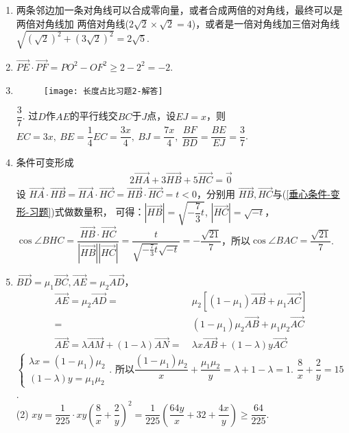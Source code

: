 \begin{enumerate}[label={\textbf{\arabic*.}},leftmargin=
    \inteval{\myenumleftmargin}pt]
\item 
两条邻边加一条对角线可以合成零向量，或者合成两倍的对角线，最终可以是两倍对角线加
两倍对角线($ 2\sqrt{2}\times \sqrt{2} =4 $)，或者是一倍对角线加三倍对角线\\
$ \sqrt{(\sqrt{2})^2+(3\sqrt{2})^2}=2\sqrt{5} $. 

\item $ \vec{PE}\cdot \vec{PF}=PO^2-OF^2 \geq 2-2^2=-2 $. 

\item 
\begin{figure}[h]
    \centering
    \texttt{[image: 长度占比习题2-解答]}
\end{figure}
$ \dfrac{3}{7} $. 过$ D $作$ AE $的平行线交$ BC $于$ J $点，设$ EJ=x $，则$ EC=3x,\ BE=\dfrac{1}{4}EC=\dfrac{3x}{4},\ BJ=\dfrac{7x}{4},\ \dfrac{BF}{BD}=\dfrac{BE}{EJ}=\dfrac{3}{7} $. 

\item 条件可变形成
\begin{align}\label{垂心条件-变形-习题}
    2\vec{HA}+
    3\vec{HB} +5\vec{HC}=\vec{0}
\end{align}
设 $ \vec{HA}\cdot \vec{HB}=\vec{HA}
\cdot\vec{HC}=\vec{HB}\cdot \vec{HC}=t<0 $，分别用
$ \vec{HB},\vec{HC} $与(\ref{垂心条件-变形-习题})式做数量积，
可得：$ |\vec{HB}|=\sqrt{-\dfrac{7}{3}t} $, $ |\vec{HC}|=\sqrt{-t} $，
$ \cos\angle BHC=\dfrac{\vec{HB}\cdot \vec{HC}}
{|\vec{HB}||\vec{HC}|}=\dfrac{t}{\sqrt{-\frac{7}{3}t}\sqrt{-t}}
=-\dfrac{\sqrt{21}}{7} $，所以$ \cos \angle BAC=\dfrac{\sqrt{21}}{7} $.

\item 
$ \vec{BD}=\mu_1\vec{BC}, \vec{AE} =\mu_2\vec{AD} $，
\begin{align*}
    \vec{AE} =\mu_2\vec{AD} =&\ \mu_2\left[
    (1-\mu_1)\vec{AB}+\mu_1\vec{AC}\right]\\
    =&\ (1-\mu_1)\mu_2\vec{AB}+\mu_1\mu_2\vec{AC} \\
    \vec{AE}=\lambda\vec{AM}+(1-\lambda)
    \vec{AN}=&\ \lambda x\vec{AB}+(1-\lambda)y
    \vec{AC}
\end{align*}
$ \begin{cases}
    \lambda x = (1-\mu_1)\mu_2 \\
    (1-\lambda)y = \mu_1\mu_2
\end{cases} $. 所以$ \dfrac{(1-\mu_1)\mu_2}{x}+\dfrac{\mu_1\mu_2}{y}
=\lambda+1-\lambda=1 $.  \quad $ \dfrac{8}{x}+\dfrac{2}{y}=15 $. \\
(2) $ xy=\dfrac{1}{225}\cdot xy \left(\dfrac{8}{x}+\dfrac{2}{y}\right)^2=
\dfrac{1}{225}\left(\dfrac{64y}{x}+32+\dfrac{4x}{y}\right)\geq\dfrac{64}{225} $. 


\end{enumerate}
